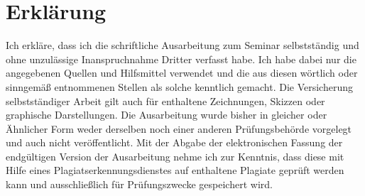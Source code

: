 \documentclass[11pt]{scrartcl}
\theoremstyle{definition}
\begin{document}
\newpage

\typeout{}



\newpage

\section*{Erklärung}
Ich erkläre, dass ich die schriftliche Ausarbeitung zum Seminar selbstständig und ohne unzulässige Inanspruchnahme Dritter verfasst habe. Ich habe dabei nur die angegebenen Quellen und Hilfsmittel verwendet und die aus diesen wörtlich oder sinngemäß entnommenen Stellen als solche kenntlich gemacht. Die Versicherung selbstständiger Arbeit gilt auch für enthaltene Zeichnungen, Skizzen oder graphische Darstellungen. Die Ausarbeitung wurde bisher in gleicher oder Ähnlicher Form weder derselben noch einer anderen Prüfungsbehörde vorgelegt und auch nicht veröffentlicht. Mit der Abgabe der elektronischen Fassung der endgültigen Version der Ausarbeitung nehme ich zur Kenntnis, dass diese mit Hilfe eines Plagiatserkennungsdienstes auf enthaltene Plagiate geprüft werden kann und ausschließlich für Prüfungszwecke gespeichert wird.
\end{document}
